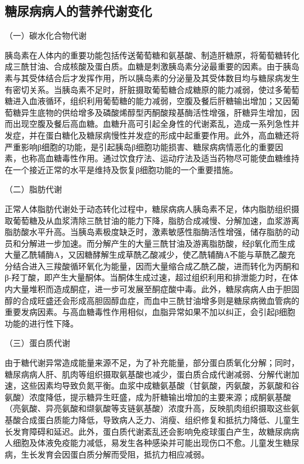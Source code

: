 \hypertarget{text00004.htmlux5cux23mllj21}{%
\subsection{糖尿病病人的营养代谢变化}\label{text00004.htmlux5cux23mllj21}}

（一）碳水化合物代谢

胰岛素在人体内的重要功能包括传送葡萄糖和氨基酸、制造肝糖原，将葡萄糖转化成三酰甘油、合成核酸及蛋白质。血糖是刺激胰岛素分泌最重要的因素。由于胰岛素与其受体结合后才发挥作用，所以胰岛素的分泌量及其受体数目均与糖尿病发生有密切关系。当胰岛素不足时，肝脏摄取葡萄糖合成糖原的能力减弱，使过多葡萄糖进入血液循环，组织利用葡萄糖的能力减弱，空腹及餐后肝糖输出增加；又因葡萄糖异生底物的供给增多及磷酸烯醇型丙酮酸羧基酶活性增强，肝糖异生增加，因而出现空腹及餐后高血糖。血糖升高可引起全身性的代谢紊乱，造成一系列急性并发症，并在蛋白糖化及糖尿病慢性并发症的形成中起重要作用。此外，高血糖还将严重影响β细胞的功能，是引起胰岛β细胞功能损害、糖尿病病情恶化的重要因素，也称高血糖毒性作用。通过饮食疗法、运动疗法及适当药物尽可能使血糖维持在一个接近正常的水平是维持及恢复β细胞功能的一个重要措施。

（二）脂肪代谢

正常人体脂肪代谢处于动态转化过程中，糖尿病病人胰岛素不足，体内脂肪组织摄取葡萄糖及从血浆清除三酰甘油的能力下降，脂肪合成减慢、分解加速，血浆游离脂肪酸水平升高。当胰岛素极度缺乏时，激素敏感性脂酶活性增强，储存脂肪的动员和分解进一步加速。而分解产生的大量三酰甘油及游离脂肪酸，经β氧化而生成大量乙酰辅酶A，又因糖酵解生成草酰乙酸减少，使乙酰辅酶A不能与草酰乙酸充分结合进入三羧酸循环氧化为能量，因而大量缩合成乙酰乙酸，进而转化为丙酮和β-羟丁酸，即产生大量酮体。当酮体生成过速，超过组织利用和排泄能力时，在体内大量堆积而造成酮症，进一步可发展至酮症酸中毒。此外，糖尿病病人由于胆固醇的合成旺盛还会形成高胆固醇血症，而血中三酰甘油增多则是糖尿病微血管病的重要发病因素。与高血糖毒性作用相似，血脂异常如果不加以纠正，会引起β细胞功能的进行性下降。

（三）蛋白质代谢

由于糖代谢异常造成能量来源不足，为了补充能量，部分蛋白质氧化分解；同时，糖尿病病人肝、肌肉等组织摄取氨基酸也减少，蛋白质合成代谢减弱、分解代谢加速，这些因素均导致负氮平衡。血浆中成糖氨基酸（甘氨酸，丙氨酸，苏氨酸和谷氨酸）浓度降低，提示糖异生旺盛，成为肝糖输出增加的主要来源；成酮氨基酸（亮氨酸、异亮氨酸和缬氨酸等支链氨基酸）浓度升高，反映肌肉组织摄取这些氨基酸合成蛋白质能力降低，导致病人乏力、消瘦、组织修复和抵抗力降低、儿童生长发育障碍和延迟。此外，蛋白质代谢紊乱还会影响免疫球蛋白产生，故糖尿病病人细胞及体液免疫能力减低，易发生各种感染并可能出现伤口不愈。儿童发生糖尿病，生长发育会因蛋白质分解而受阻，抵抗力相应减弱。

